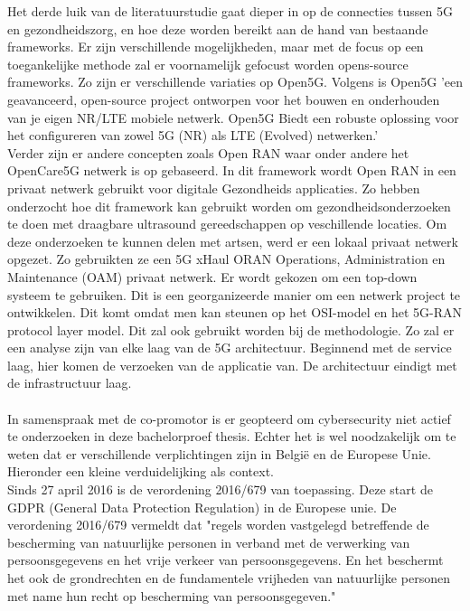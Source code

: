 Het derde luik van de literatuurstudie gaat dieper in op de connecties tussen 5G en gezondheidszorg, en hoe deze worden bereikt aan de hand van bestaande frameworks. Er zijn verschillende mogelijkheden, maar met de focus op een toegankelijke methode zal er voornamelijk gefocust worden opens-source frameworks. Zo zijn er verschillende variaties op Open5G. Volgens \textcite{Open5GS2024} is Open5G 'een geavanceerd, open-source project ontworpen voor het bouwen en onderhouden van je eigen NR/LTE mobiele netwerk. Open5G Biedt een robuste oplossing voor het configureren van zowel 5G (NR) als LTE (Evolved) netwerken.' \\ Verder zijn er andere concepten zoals Open RAN waar onder andere het OpenCare5G netwerk is op gebaseerd. In dit framework wordt Open RAN in een privaat netwerk gebruikt voor digitale Gezondheids applicaties. Zo hebben \textcite{de2023opencare5g} onderzocht hoe dit framework kan gebruikt worden om gezondheidsonderzoeken te doen met draagbare ultrasound gereedschappen op veschillende locaties. Om deze onderzoeken te kunnen delen met artsen, werd er een lokaal privaat netwerk opgezet. Zo gebruikten ze een 5G xHaul ORAN Operations, Administration en Maintenance (OAM) privaat netwerk. Er wordt gekozen om een top-down systeem te gebruiken. Dit is een georganizeerde manier om een netwerk project te ontwikkelen. Dit komt omdat men kan steunen op het OSI-model en het 5G-RAN protocol layer model. Dit zal ook gebruikt worden bij de methodologie. Zo zal er een analyse zijn van elke laag van de 5G architectuur. Beginnend met de service laag, hier komen de verzoeken van de applicatie van. De architectuur eindigt met de infrastructuur laag. \autocite{de2023opencare5g}
\\\\
In samenspraak met de co-promotor is er geopteerd om cybersecurity niet actief te onderzoeken in deze bachelorproef thesis. Echter het is wel noodzakelijk om te weten dat er verschillende verplichtingen zijn in België en de Europese Unie. Hieronder een kleine verduidelijking als context.
\\
Sinds 27 april 2016 is de verordening 2016/679 van toepassing. Deze start de GDPR (General Data Protection Regulation) in de Europese unie. De verordening 2016/679 vermeldt dat "regels worden vastgelegd betreffende de bescherming van natuurlijke personen in verband met de verwerking van persoonsgegevens en het vrije verkeer van persoonsgegevens. En het beschermt het ook de grondrechten en de fundamentele vrijheden van natuurlijke personen met name hun recht op bescherming van persoonsgegeven."\\ \autocite{gdpr2016} 
